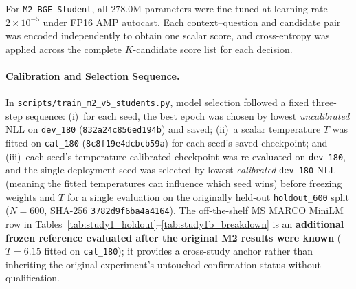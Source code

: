 \documentclass[11pt,a4paper]{article}
\begin{document}
For \texttt{M2 BGE Student}, all $278.0$M parameters were fine-tuned at learning rate $2\times 10^{-5}$ under FP16 AMP autocast. Each context--question and candidate pair was encoded independently to obtain one scalar score, and cross-entropy was applied across the complete $K$-candidate score list for each decision.

\paragraph{Calibration and Selection Sequence.}
In \texttt{scripts/train\_m2\_v5\_students.py}, model selection followed a fixed three-step sequence: (i)~for each seed, the best epoch was chosen by lowest \emph{uncalibrated} NLL on \texttt{dev\_180} (\texttt{832a24c856ed194b}) and saved; (ii)~a scalar temperature $T$ was fitted on \texttt{cal\_180} (\texttt{8c8f19e4dcbcb59a}) for each seed's saved checkpoint; and (iii)~each seed's temperature-calibrated checkpoint was re-evaluated on \texttt{dev\_180}, and the single deployment seed was selected by lowest \emph{calibrated} \texttt{dev\_180} NLL (meaning the fitted temperatures can influence which seed wins) before freezing weights and $T$ for a single evaluation on the originally held-out \texttt{holdout\_600} split ($N=600$, SHA-256 \texttt{3782d9f6ba4a4164}). The off-the-shelf MS MARCO MiniLM row in Tables~\ref{tab:study1_holdout}--\ref{tab:study1b_breakdown} is an \textbf{additional frozen reference evaluated after the original M2 results were known} ($T=6.15$ fitted on \texttt{cal\_180}); it provides a cross-study anchor rather than inheriting the original experiment's untouched-confirmation status without qualification.
\end{document}
